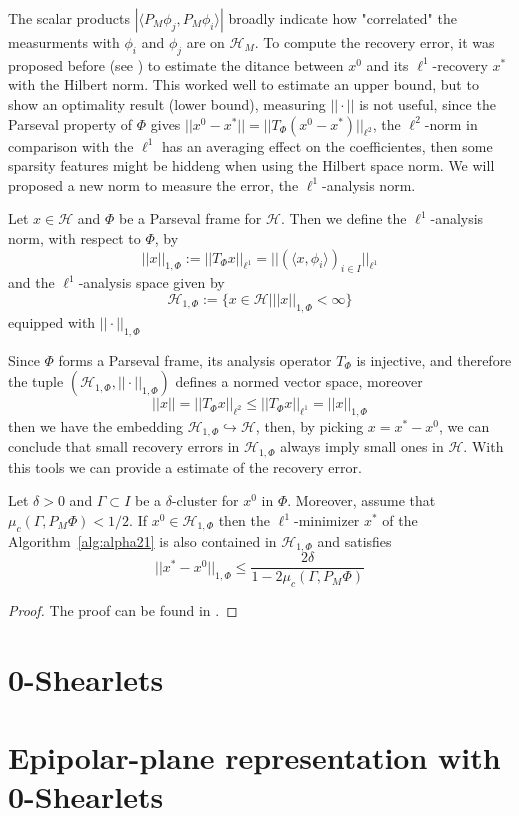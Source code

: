 The scalar products $|\langle P_M\phi_j,P_M\phi_i\rangle|$ broadly indicate how "correlated" the measurments with $\phi_i$ and $\phi_j$ are on $\mathcal{H}_M$. To compute the recovery error, it was proposed before (see \cite{Firstinpaint}) to estimate the ditance between $x^0$ and its $\ell^1$-recovery $x^*$ with the Hilbert norm. This worked well to estimate an upper bound, but to show an optimality result (lower bound), measuring $||\cdot||$ is not useful, since the Parseval property of $\Phi$ gives $||x^0-x^*||=||T_{\Phi}(x^0-x^*)||_{\ell^2}$, the $\ell^2$-norm in comparison with the $\ell^1$ has an averaging effect on the coefficientes, then some sparsity features might be hiddeng when using the Hilbert space norm. We will proposed a new norm to measure the error, the $\ell^1$-analysis norm.

\bigskip

\begin{defn}
Let $x\in\mathcal{H}$ and $\Phi$ be a Parseval frame for $\mathcal{H}$. Then we define the $\ell^1$-analysis norm, with respect to $\Phi$, by
$$
||x||_{1,\Phi}:=||T_{\Phi}x||_{\ell^1}=||(\langle x,\phi_i\rangle)_{i\in I}||_{\ell^1}
$$
and the $\ell^1$-analysis space given by 
$$
\mathcal{H}_{1,\Phi}:=\{x\in \mathcal{H}|||x||_{1,\Phi}<\infty\}
$$
equipped with $||\cdot||_{1,\Phi}$
\end{defn}

Since $\Phi$ forms a Parseval frame, its analysis operator $T_{\Phi}$ is injective, and therefore the tuple $(\mathcal{H}_{1,\Phi},||\cdot||_{1,\Phi})$ defines a normed vector space, moreover
\begin{equation}
\label{eq:alpha24}
||x||=||T_{\Phi}x||_{\ell^2}\leq ||T_{\Phi}x||_{\ell^1}=||x||_{1,\Phi}
\end{equation}
then we have the embedding $\mathcal{H}_{1,\Phi}\hookrightarrow\mathcal{H}$, then, by picking $x=x^*-x^0$, we can conclude that small recovery errors in $\mathcal{H}_{1,\Phi}$ always imply small ones in $\mathcal{H}$. With this tools we can provide a estimate of the recovery error.

\begin{thm}
\label{thm:alpha25}
Let $\delta>0$ and $\Gamma\subset I$ be a $\delta$-cluster for $x^0$ in $\Phi$. Moreover, assume that $\mu_c(\Gamma,P_M\Phi)<1/2$. If $x^0\in\mathcal{H}_{1,\Phi}$ then the $\ell^1$-minimizer $x^*$ of the Algorithm~\ref{alg:alpha21} is also contained in $\mathcal{H}_{1,\Phi}$ and satisfies 
\begin{equation}
\label{eq:alpha25}
||x^*-x^0||_{1,\Phi}\leq \frac{2\delta}{1-2\mu_c(\Gamma,P_M\Phi)}
\end{equation}
\end{thm}
\begin{proof}
The proof can be found in \cite{Firstinpaint}.
\end{proof}

\section{0-Shearlets}


\section{Epipolar-plane representation with 0-Shearlets}
